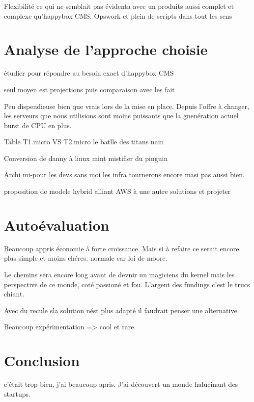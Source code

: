 \documentclass[11pt, a4paper ]{article}
\let\stdsection\section
\renewcommand\section{\newpage\stdsection}
\begin{document}
\begin{spacing}{1.5}
Flexibilité ce qui ne semblait pas évidenta avec un produits aussi complet et complexe qu'happybox CMS. Opswork et plein de scripts dans tout les sens


	\section{Analyse de l'approche choisie} %
étudier pour répondre au besoin exact d'happybox CMS

seul moyen est projections puis comparaison avec les fait

Peu dispendieuse bien que vrais lors de la mise en place. Depuis l'offre à changer, les serveurs que nous utilisions sont moins puissants que la gnenération actuel burst de CPU en plus.

			Table T1.micro VS T2.micro le batlle des titans nain

Conversion de danny à linux mint mistifier du pinguin

Archi mi-pour les devs sans moi les infra tournerons encore masi pas aussi bien.

proposition de modele hybrid alliant AWS à une autre solutions et projeter




	\section{Autoévaluation} %

Beaucoup appris économie à forte croissance.
Mais si à refaire ce serait encore plus simple et moins chéres.
normale  car loi  de moore.

Le chemins sera encore long avant de devnir un magiciens du kernel mais les perspective de ce monde, coté passioné et fou. L'argent des fundings c'est le trucs chiant.

Avec du recule sla solution nést plus adapté il faudrait penser une alternative.

Beaucoup expérimentation => cool et rare

	\section{Conclusion} %

		c'était trop bien, j'ai beaucoup apris. J'ai découvert un monde halucinant des startups.


\end{spacing}
\end{document}
